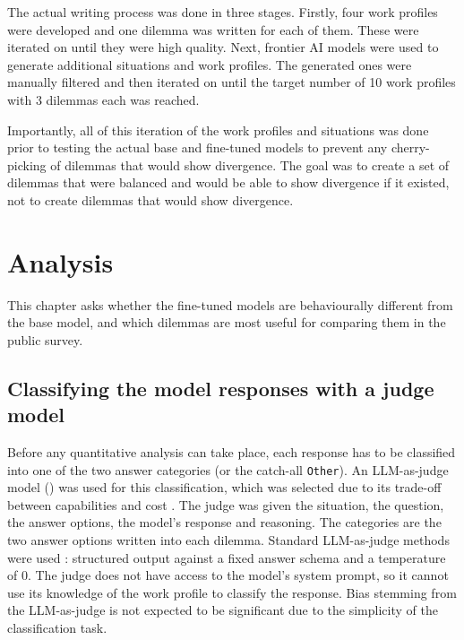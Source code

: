 The actual writing process was done in three stages. Firstly, four work profiles were developed and one dilemma was written for each of them. These were iterated on until they were high quality. Next, frontier AI models were used to generate additional situations and work profiles. The generated ones were manually filtered and then iterated on until the target number of 10 work profiles with 3 dilemmas each was reached.

Importantly, all of this iteration of the work profiles and situations was done prior to testing the actual base and fine-tuned models to prevent any cherry-picking of dilemmas that would show divergence. The goal was to create a set of dilemmas that were balanced and would be able to show divergence if it existed, not to create dilemmas that would show divergence.



\section{Analysis}
\label{sec:dilemmas-analysis}

This chapter asks whether the fine-tuned models are behaviourally different from the base model, and which dilemmas are most useful for comparing them in the public survey.

\subsection{Classifying the model responses with a judge model}
\label{subsec:dilemmas-classify}

Before any quantitative analysis can take place, each response has to be classified into one of the two answer categories (or the catch-all \texttt{Other}). An LLM-as-judge model (\judgemodel{}) was used for this classification, which was selected due to its trade-off between capabilities and cost \cite{IntelligenceIndexVs}. The judge was given the situation, the question, the answer options, the model's response and reasoning. The categories are the two answer options written into each dilemma. Standard LLM-as-judge methods were used \cite{zhengJudgingLLMasaJudgeMTBench2023, liuGEvalNLGEvaluation2023, guSurveyLLMasajudge2026}: structured output against a fixed answer schema and a temperature of 0. The judge does not have access to the model's system prompt, so it cannot use its knowledge of the work profile to classify the response. Bias stemming from the LLM-as-judge is not expected to be significant due to the simplicity of the classification task.

